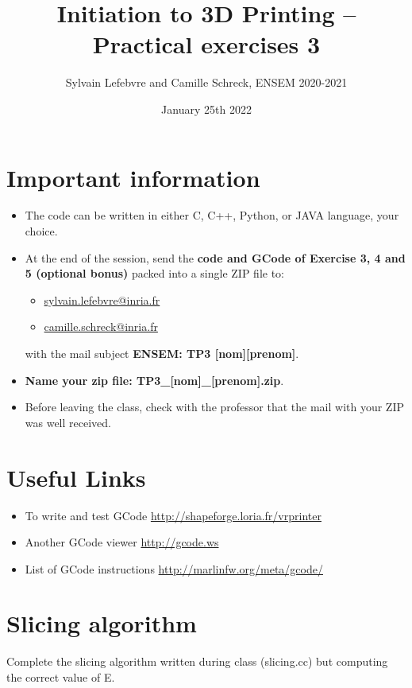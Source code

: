 \documentclass{article}
\date{January 25th 2022}
\title{Initiation to 3D Printing -- Practical exercises 3}
\author{Sylvain Lefebvre and Camille Schreck, ENSEM 2020-2021}
\begin{document}
\maketitle

\section{Important information}
\begin{itemize}
    \item The code can be written in either C, C++, Python, or JAVA language, your choice.
    \item At the end of the session, send the {\bfseries code and GCode of Exercise 3, 4 and 5 (optional bonus)} packed into a single ZIP file to:
          \begin{itemize}
        \item \href{mailto:sylvain.lefebvre@inria.fr}{sylvain.lefebvre@inria.fr}
        \item \href{mailto:camille.schreck@inria.fr}{camille.schreck@inria.fr}
    \end{itemize}
    with the mail subject {\bfseries ENSEM: TP3 [nom][prenom]}.
    \item {\bfseries Name your zip file: TP3\_[nom]\_[prenom].zip}.
    \item Before leaving the class, check with the professor that the mail with your ZIP was well received.
\end{itemize}

\section{Useful Links}

\begin{itemize}
	\item To write and test GCode \url{http://shapeforge.loria.fr/vrprinter}
	\item Another GCode viewer \url{http://gcode.ws}
	\item List of GCode instructions \url{http://marlinfw.org/meta/gcode/}
\end{itemize}

\section{Slicing algorithm}

Complete the slicing algorithm written during class (slicing.cc) but computing the correct value of E.
\end{document}
